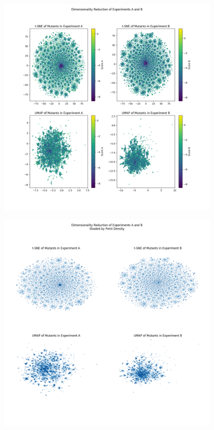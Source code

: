 \documentclass[16pt]{book}
\begin{document}
\begin{figure}
	\includegraphics[width=\textwidth]{img/dimred-plt.png}
	\caption{\label{dimredplt}}
\end{figure}
\begin{figure}
	\includegraphics[width=\textwidth]{img/dimred-ds.png}
	\caption{\label{dimredds}}
\end{figure}
\end{document}
